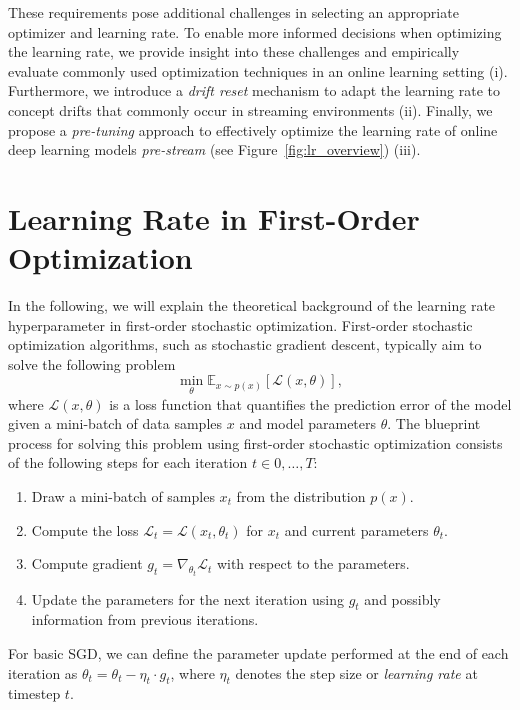 \documentclass[runningheads]{llncs}
\begin{document}
These requirements pose additional challenges in selecting an appropriate optimizer and learning rate.
To enable more informed decisions when optimizing the learning rate, we provide insight into these challenges and empirically evaluate commonly used optimization techniques in an online learning setting (i).
Furthermore, we introduce a \textit{drift reset} mechanism to adapt the learning rate to concept drifts that commonly occur in streaming environments (ii).
Finally, we propose a \textit{pre-tuning} approach to effectively optimize the learning rate of online deep learning models \textit{pre-stream} (see Figure~\ref{fig:lr_overview}) (iii).


\section{Learning Rate in First-Order Optimization}

In the following, we will explain the theoretical background of the learning rate hyperparameter in first-order stochastic optimization.
First-order stochastic optimization algorithms, such as stochastic gradient descent, typically aim to solve the following problem
\begin{equation}
	\min_{\theta} \mathbb{E}_{x \sim p(x)} [\mathcal{L}(x, \theta)],
\end{equation}
where $\mathcal{L}(x, \theta)$ is a loss function that quantifies the prediction error of the model given a mini-batch of data samples $x$ and model parameters $\theta$.
The blueprint process for solving this problem using first-order stochastic optimization consists of the following steps for each iteration $t \in 0, \ldots, T$:
\begin{enumerate}
	\item Draw a mini-batch of samples $x_t$ from the distribution $p(x)$.
	\item Compute the loss $\mathcal{L}_t = \mathcal{L}(x_t, \theta_t)$ for $x_t$ and current parameters $\theta_t$.
	\item Compute gradient $g_t = \nabla_{\theta_t} \mathcal{L}_t$ with respect to the parameters.
	\item Update the parameters for the next iteration using $g_t$ and possibly information from previous iterations.
\end{enumerate}

For basic SGD, we can define the parameter update performed at the end of each iteration as
$\theta_{t}  = \theta_{t} - \eta_t \cdot g_t$,
where $\eta_t$ denotes the step size or \textit{learning rate} at timestep $t$.
\end{document}

